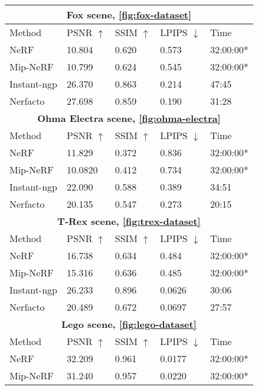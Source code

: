 \begin{table}[h]
\centering
\begin{tabular}{|l|llll|}
\hline
\multicolumn{5}{|c|}{\textbf{Fox scene, \autoref{fig:fox-dataset}}} \\ 
\hline
Method  & PSNR $\uparrow$ & SSIM $\uparrow$ & LPIPS $\downarrow$& Time  \\ 
\hline
NeRF        & 10.804    & 0.620     & 0.573    & 32:00:00*   \\
Mip-NeRF    & 10.799    & 0.624     & 0.545    & 32:00:00*    \\
Instant-ngp & 26.370    & 0.863     & 0.214    & 47:45    \\
Nerfacto    & 27.698    & 0.859     & 0.190    & 31:28    \\
\hline
\hline
\multicolumn{5}{|c|}{\textbf{Ohma Electra scene, \autoref{fig:ohma-electra}}} \\ 
\hline
Method  & PSNR $\uparrow$ & SSIM $\uparrow$ & LPIPS $\downarrow$& Time  \\ 
\hline
NeRF        & 11.829    &  0.372     & 0.836    & 32:00:00*    \\
Mip-NeRF    & 10.0820    & 0.412     & 0.734    & 32:00:00*    \\
Instant-ngp & 22.090    & 0.588     & 0.389    & 34:51    \\
Nerfacto    & 20.135    & 0.547     & 0.273    & 20:15    \\ 
\hline
\hline
\multicolumn{5}{|c|}{\textbf{T-Rex scene, \autoref{fig:trex-dataset}}} \\ 
\hline
Method  & PSNR $\uparrow$ & SSIM $\uparrow$ & LPIPS $\downarrow$& Time  \\ 
\hline
NeRF        & 16.738    & 0.634     & 0.484    & 32:00:00*    \\
Mip-NeRF    & 15.316    & 0.636     & 0.485    & 32:00:00*    \\
Instant-ngp    & 26.233    & 0.896     & 0.0626    & 30:06    \\
Nerfacto    & 20.489    & 0.672     & 0.0697    & 27:57    \\ 
\hline
\hline
\multicolumn{5}{|c|}{\textbf{Lego scene, \autoref{fig:lego-dataset}}} \\ 
\hline
Method  & PSNR $\uparrow$ & SSIM $\uparrow$ & LPIPS $\downarrow$& Time  \\ 
\hline
NeRF        & 32.209    & 0.961     & 0.0177    & 32:00:00*    \\
Mip-NeRF    & 31.240    & 0.957     & 0.0220    & 32:00:00*    \\

\end{tabular}
\end{table}
